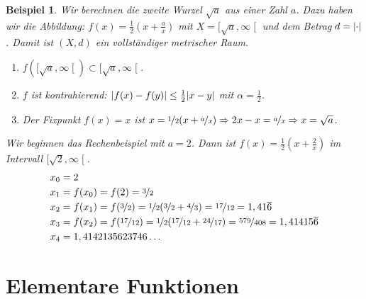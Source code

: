 \documentclass[ngerman,titlepage,twoside, parskip=half*]{scrreprt}
\theoremstyle{break}
\theoremstyle{nonumberbreak}
\newtheorem{beispiel}{Beispiel}
\DeclarePairedDelimiter{\abs}{\lvert}{\rvert}
\newcommand*{\rsofint}[1]{[#1\mathclose{[}}  %
\begin{document}
\begin{beispiel}
  Wir berechnen die zweite Wurzel $\sqrt{a}$ aus einer Zahl $a$. Dazu
  haben wir die Abbildung: $f(x)=\frac{1}{2}(x+\frac{a}{x})$ mit $X=
  \rsofint{\sqrt{a},\infty}$ und dem Betrag $d=\abs{\cdot}$. Damit ist
  $(X,d)$ ein vollständiger metrischer Raum.
  \begin{enumerate}
  \item $f(\rsofint{\sqrt{a},\infty})\subset
    \rsofint{\sqrt{a},\infty}$.
  \item $f$ ist kontrahierend: $\abs{f(x)-f(y)}\leq
    \frac{1}{2}\abs{x-y}$ mit $\alpha=\frac{1}{2}$.
  \item Der Fixpunkt $f(x)=x$ ist $x=\nicefrac{1}{2}
    (x+\nicefrac{a}{x}) \Rightarrow 2x-x = \nicefrac{a}{x} \Rightarrow
    x = \sqrt{a}$.
  \end{enumerate}
  
  Wir beginnen das Rechenbeispiel mit $a=2$. Dann ist
  $f(x)=\frac{1}{2}(x+\frac{2}{x})$ im Intervall $\rsofint{\sqrt{2},\infty}$.
  \begin{align*}
    x_0 & = 2\\
    x_1 & = f(x_0)=f(2)=\nicefrac{3}{2}\\
    x_2 & = f(x_1)= f(\nicefrac{3}{2})= \nicefrac{1}{2} (\nicefrac{3}{2}
    +\nicefrac{4}{3})=\nicefrac{17}{12}=1,41\overline{6}\\
    x_3 & = f(x_2)= f(\nicefrac{17}{12})= \nicefrac{1}{2}
    (\nicefrac{17}{12} +\nicefrac{24}{17})= \nicefrac{579}{408}=
    1,41415\overline{6}\\
    x_4 & = 1,4142135623746\ldots
  \end{align*}  
\end{beispiel}

\section{Elementare Funktionen}
\end{document}
